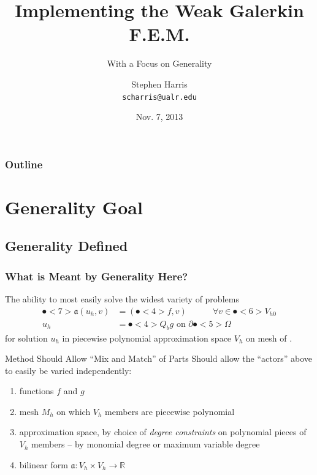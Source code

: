 \documentclass[compress]{beamer}
\title[Implementing WGFEM]{Implementing the Weak Galerkin F.E.M.}
\subtitle{With a Focus on Generality}
\author{Stephen Harris \\ \texttt{scharris@ualr.edu}}
\date{Nov. 7, 2013}
\begin{document}
\begin{frame}
  \titlepage
\end{frame}

\begin{frame}
  \frametitle{Outline}
  \tableofcontents[pausesections]
\end{frame}

\section{Generality Goal}
\subsection{Generality Defined}

\begin{frame}
  \frametitle{What is Meant by Generality Here?}
  \pause
  The ability to most easily solve the widest variety of problems
    \begin{align*}
      \spot<7>{\mathfrak{a}}(u_h,v) & = (\spot<4>{f},v)\quad\quad\quad \forall{v} \in \spot<6>{V_{h0}} \\
      u_h & = \spot<4>{Q_b g} \text{ on } \partial\spot<5>{\Omega}
    \end{align*}
    for solution $u_h$ in piecewise polynomial approximation space $V_h$ on mesh  of .
  \pause

  \begin{block}{Method Should Allow ``Mix and Match'' of Parts}
    Should allow the ``actors'' above to easily be varied independently:
    \pause
    \begin{enumerate}[<+->]
      \item functions $f$ and $g$
      \item mesh $M_h$ on which $V_h$ members are piecewise polynomial
      \item approximation space, by choice of \emph{degree constraints} on polynomial pieces of $V_h$ members -- by monomial degree or maximum variable degree
      \item bilinear form $\mathfrak{a}: V_h \times V_h \rightarrow \mathbb{R}$
    \end{enumerate}
  \end{block}

\end{frame}
\end{document}
